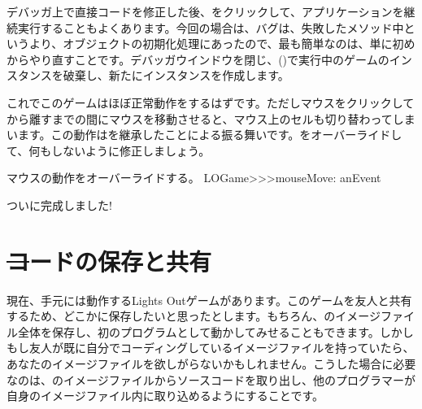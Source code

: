 \documentclass[a4paper,10pt,twoside]{book}
\begin{document}
デバッガ上で直接コードを修正した後、をクリックして、アプリケーションを継続実行することもよくあります。今回の場合は、バグは、失敗したメソッド中というより、オブジェクトの初期化処理にあったので、最も簡単なのは、単に初めからやり直すことです。デバッガウインドウを閉じ、()で実行中のゲームのインスタンスを破棄し、新たにインスタンスを作成します。



これでこのゲームはほぼ正常動作をするはずです。ただしマウスをクリックしてから離すまでの間にマウスを移動させると、マウス上のセルも切り替わってしまいます。この動作はを継承したことによる振る舞いです。をオーバーライドして、何もしないように修正しましょう。

\begin{method}[mouseMove:]{マウスの動作をオーバーライドする。}
LOGame>>>mouseMove: anEvent
\end{method}

ついに完成しました!


\section{\st コードの保存と共有}

現在、手元には動作するLights Outゲームがあります。このゲームを友人と共有するため、どこかに保存したいと思ったとします。もちろん、\pharo のイメージファイル全体を保存し、初のプログラムとして動かしてみせることもできます。しかしもし友人が既に自分でコーディングしているイメージファイルを持っていたら、あなたのイメージファイルを欲しがらないかもしれません。こうした場合に必要なのは、\pharo のイメージファイルからソースコードを取り出し、他のプログラマーが自身のイメージファイル内に取り込めるようにすることです。
\end{document}
